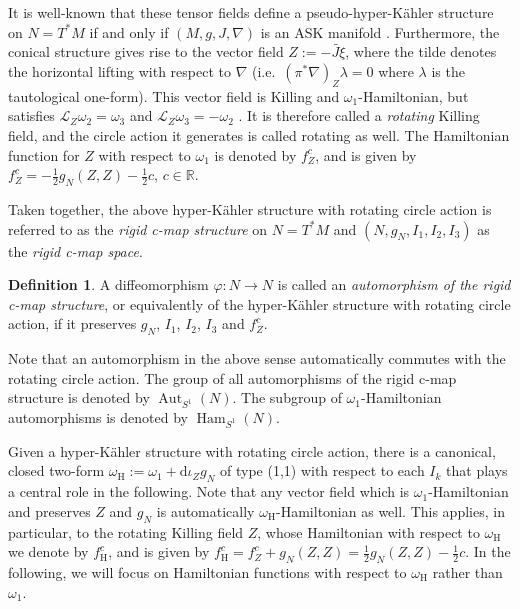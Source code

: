 \documentclass{article}
\theoremstyle{definition}
\newtheorem{definition}[theorem]{Definition}
\DeclareMathOperator{\Aut}{Aut}
\DeclareMathOperator{\Ham}{Ham}
\newcommand{\R}{\mathbb{R}}
\newcommand{\calL}{\mathcal{L}}
\newcommand{\hor}{\mathrm{H}}
\renewcommand{\d}{\mathrm{d}}
\begin{document}
	It is well-known that these tensor fields define a pseudo-hyper-K\"ahler structure on $N=T^*M$ if and only if $(M,g,J,\nabla)$ is an ASK manifold \cite{CFG89,ACD02}. Furthermore, the conical structure gives rise to the vector field $Z:=-\widetilde{J\xi}$, where the tilde denotes the horizontal lifting with respect to $\nabla$ (i.e.\ $(\pi^*\nabla)_Z\lambda=0$ where $\lambda$ is the tautological one-form). This vector field is Killing and $\omega_1$-Hamiltonian, but satisfies $\calL_Z\omega_2=\omega_3$ and $\calL_Z\omega_3=-\omega_2$ \cite[Proposition~2]{ACM13}. It is therefore called a \emph{rotating} Killing field, and the circle action it generates is called rotating as well. The Hamiltonian function for $Z$ with respect to $\omega_1$ is denoted by $f_Z^c$, and is given by $f_Z^c=-\frac{1}{2}g_N(Z,Z)-\frac{1}{2}c$, $c\in\R$.\medskip
	
	Taken together, the above hyper-K\"ahler structure with rotating circle action is referred to as the \emph{rigid c-map structure} on $N=T^*M$ and $(N,g_N,I_1,I_2,I_3)$ as the \emph{rigid c-map space}.
	
	\begin{definition}
		A diffeomorphism $\varphi:N\longrightarrow N$ is called an \emph{automorphism of the rigid c-map structure}, or equivalently of the hyper-K\"ahler structure with rotating circle action, if it preserves $g_N$, $I_1$, $I_2$, $I_3$ and $f_Z^c$.
	\end{definition}

	Note that an automorphism in the above sense automatically commutes with the rotating circle action. The group of all automorphisms of the rigid c-map structure is denoted by $\Aut_{S^1}(N)$. The subgroup of $\omega_1$-Hamiltonian automorphisms is denoted by $\Ham_{S^1}(N)$.\medskip
	
	Given a hyper-K\"ahler structure with rotating circle action, there is a canonical, closed two-form $\omega_\hor:=\omega_1+\d\iota_Zg_N$ of type (1,1) with respect to each $I_k$ \cite[Lemma~2.7]{CST22} that plays a central role in the following. Note that any vector field which is $\omega_1$-Hamiltonian and preserves $Z$ and $g_N$ is automatically $\omega_\hor$-Hamiltonian as well. This applies, in particular, to the rotating Killing field $Z$, whose Hamiltonian with respect to $\omega_\hor$ we denote by $f_\hor^c$, and is given by $f_\hor^c=f_Z^c+g_N(Z,Z)=\frac{1}{2}g_N(Z,Z)-\frac{1}{2}c$. In the following, we will focus on Hamiltonian functions with respect to $\omega_\hor$ rather than $\omega_1$.\medskip
	
\end{document}
